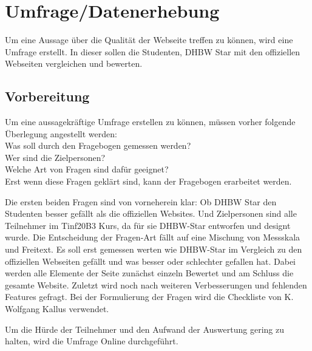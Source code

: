\chapter{Umfrage/Datenerhebung}
Um eine Aussage über die Qualität der Webseite treffen zu können, wird eine Umfrage erstellt. In dieser sollen die Studenten, DHBW Star mit den offiziellen Webseiten vergleichen und bewerten.

\section{Vorbereitung}
Um eine aussagekräftige Umfrage erstellen zu können, müssen vorher folgende Überlegung angestellt werden:\\
Was soll durch den Fragebogen gemessen werden?\\
Wer sind die Zielpersonen?\\
Welche Art von Fragen sind dafür geeignet?\\
Erst wenn diese Fragen geklärt sind, kann der Fragebogen erarbeitet werden.

Die ersten beiden Fragen sind von vorneherein klar:
Ob DHBW Star den Studenten besser gefällt als die offiziellen Websites.
Und Zielpersonen sind alle Teilnehmer im Tinf20B3 Kurs, da für sie DHBW-Star entworfen und designt wurde.
Die Entscheidung der Fragen-Art fällt auf eine Mischung von Messskala und Freitext. Es soll erst gemessen werten wie DHBW-Star im Vergleich zu den offiziellen Webseiten gefällt und was besser oder schlechter gefallen hat.
Dabei werden alle Elemente der Seite zunächst einzeln Bewertet und am Schluss die gesamte Website.
Zuletzt wird noch nach weiteren Verbesserungen und fehlenden Features gefragt.
Bei der Formulierung der Fragen wird die Checkliste von K. Wolfgang Kallus verwendet.
\cite{fragebogenKallus}

Um die Hürde der Teilnehmer und den Aufwand der Auswertung gering zu halten, wird die Umfrage Online durchgeführt.

